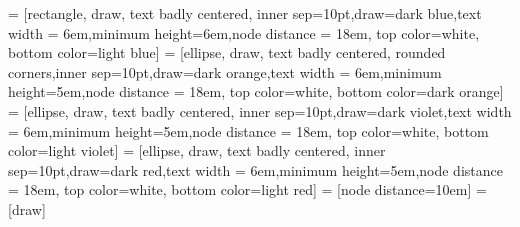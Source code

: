 \documentclass[12pt]{article}
\begin{document}
     
     
     = [rectangle, draw, 
        text badly centered, inner sep=10pt,draw=dark blue,text width = 6em,minimum height=6em,node distance = 18em, 
            top color=white, 
            bottom color=light blue]
     = [ellipse, draw,
        text badly centered, rounded corners,inner sep=10pt,draw=dark orange,text width = 6em,minimum height=5em,node distance = 18em, 
            top color=white, 
            bottom color=dark orange]
     = [ellipse, draw,
        text badly centered, inner sep=10pt,draw=dark violet,text width = 6em,minimum height=5em,node distance = 18em, 
            top color=white, 
            bottom color=light violet]
     = [ellipse, draw,
        text badly centered, inner sep=10pt,draw=dark red,text width = 6em,minimum height=5em,node distance = 18em, 
            top color=white, 
            bottom color=light red]
     = [node distance=10em]
     = [draw]
     
\end{document}
